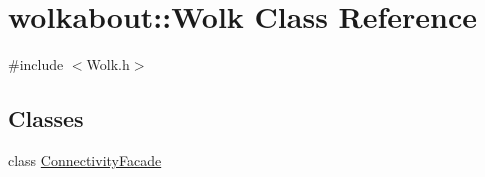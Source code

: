 \hypertarget{classwolkabout_1_1_wolk}{}\section{wolkabout\+:\+:Wolk Class Reference}
\label{classwolkabout_1_1_wolk}


{\ttfamily \#include $<$Wolk.\+h$>$}

\subsection*{Classes}
\begin{DoxyCompactItemize}
\item 
class \hyperlink{classwolkabout_1_1_wolk_1_1_connectivity_facade}{Connectivity\+Facade}
\end{DoxyCompactItemize}
